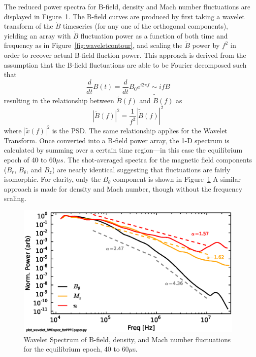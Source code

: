\documentclass[12pt]{iopart}
\begin{document}
The reduced power spectra for B-field, density and Mach number fluctuations are displayed in Figure~\ref{fig:waveletspec}. The B-field curves are produced by first taking a wavelet transform of the $\dot{B}$ timeseries (for any one of the orthogonal components), yielding an array with $\dot{B}$ fluctuation power as a function of both time and frequency as in Figure~\ref{fig:waveletcontour}, and scaling the $\dot{B}$ power by $f^{2}$ in order to recover actual B-field fluction power. This approach is derived from the assumption that the B-field fluctuations are able to be Fourier decomposed such that
%
\begin{equation}
\frac{d}{dt}B(t) = \frac{d}{dt}B_{0}e^{i2\pi f} \sim ifB
\end{equation}
%
resulting in the relationship between $\tilde{B}(f)$ and $\tilde{\dot{B}}(f)$ as
%
\begin{equation}
|\tilde{B}(f)|^{2} = \frac{1}{f^{2}}|\tilde{\dot{B}}(f)|^{2}
\end{equation}
%
where $|\tilde{x}(f)|^{2}$ is the PSD. The same relationship applies for the Wavelet Transform. Once converted into a B-field power array, the 1-D spectrum is calculated by summing over a certain time region---in this case the equilibrium epoch of 40 to 60$\mu s$. The shot-averaged spectra for the magnetic field components ($B_{r}$, $B_{\theta}$, and $B_{z}$) are nearly identical suggesting that fluctuations are fairly isomorphic. For clarity, only the $B_{\theta}$ component is shown in Figure~\ref{fig:waveletspec}  A similar approach is made for density and Mach number, though without the frequency scaling.

\begin{figure}[!htbp]
\centerline{
\includegraphics[width=16cm]{waveletspec.eps}}
\caption{\label{fig:waveletspec} Wavelet Spectrum of B-field, density, and Mach number fluctuations for the equilibrium epoch, 40 to 60$\mu$s.}
\end{figure}
\end{document}
